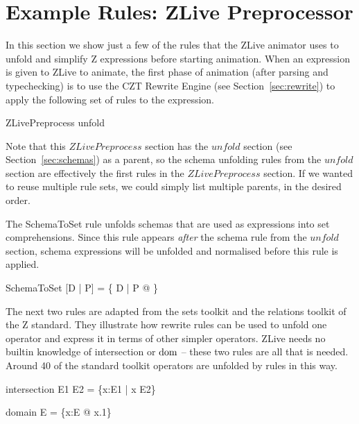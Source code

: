 \documentclass{entcs}
\begin{document}
\section{Example Rules: ZLive Preprocessor} \label{sec:zlive}

In this section we show just a few of the rules that the ZLive
animator uses to unfold and simplify Z expressions before starting
animation.  When an expression is given to ZLive to animate, the first
phase of animation (after parsing and typechecking) is to use the CZT
Rewrite Engine (see Section~\ref{sec:rewrite}) to apply the following
set of rules to the expression.

\begin{zsection}
  \SECTION ZLivePreprocess \parents unfold
\end{zsection}

Note that this $ZLivePreprocess$ section has the $unfold$ section (see
Section~\ref{sec:schemas}) as a parent, so the schema unfolding rules
from the $unfold$ section are effectively the first rules in the
$ZLivePreprocess$ section.  If we wanted to reuse multiple rule sets,
we could simply list multiple parents, in the desired order.

The SchemaToSet rule unfolds schemas that are used as expressions into
set comprehensions.  Since this rule appears \emph{after} the schema
rule from the $unfold$ section, schema expressions will be unfolded
and normalised before this rule is applied.
\begin{zedrule}{SchemaToSet}
[D | P] = \{ D | P @ \theta [D | true] \}
\end{zedrule}

The next two rules are adapted from the sets toolkit and the
relations toolkit of the Z standard.  They illustrate how rewrite rules
can be used to unfold one operator and express it in terms of other
simpler operators.  ZLive needs no builtin knowledge of intersection
or $\mathop{\mathstrut{\mbox{\textrm{dom}}}}\nolimits$ -- these two rules are all that is needed.  Around 40 of the
standard toolkit operators are unfolded by rules in this way.

\begin{zedrule}{intersection}
   E1 \cap E2 = \{x:E1 | x \in E2\}
\end{zedrule}
\begin{zedrule}{domain}
   \dom E = \{x:E @ x.1\}
\end{zedrule}
\end{document}
